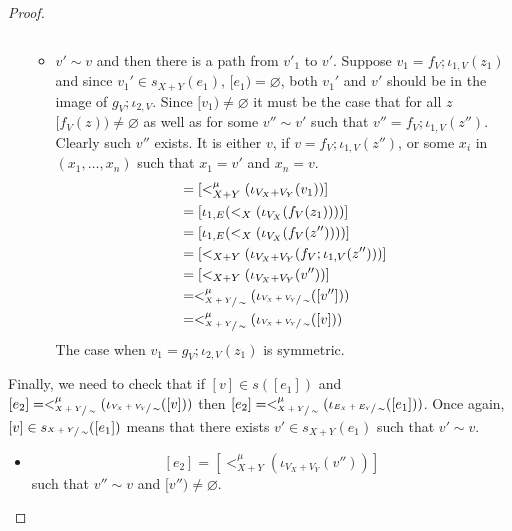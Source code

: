 \begin{proof}
\begin{itemize}
\begin{itemize}
\[                \]
                \item $v' \sim v$ and then there is a path from $v'_1$ to $v'$. 
                Suppose $v_1 = f_{V};\iota_{1,V}(z_1)$ and since $v_1' \in s_{X+Y}(e_1)$, $[e_1) = \varnothing$, both $v_1'$ and $v'$ should be in the image of $g_{V};\iota_{2,V}$.
                Since $[v_1) \not = \varnothing$ it must be the case that for all $z$ $[f_{V}(z)) \not = \varnothing$ as well as for some $v'' \sim v'$ such that $v'' = f_{V};\iota_{1,V}(z'')$.
                Clearly such $v''$ exists.
                It is either $v$, if $v = f_{V};\iota_{1,V}(z'')$, or some $x_i$ in $(x_1, \ldots, x_n)$ such that $x_1 = v'$ and $x_n = v$.
                \begin{align*}
                    [e_2] &= [<_{X+Y}^{\mu}(\iota_{V_{X} + V_{Y}}(v_1))]\\
                          &= [\iota_{1,E}(<_{X}(\iota_{V_{X}}(f_{V}(z_1))))]\\
                          &= [\iota_{1,E}(<_{X}(\iota_{V_{X}}(f_{V}(z''))))]\\
                          &= [<_{X+Y}(\iota_{V_{X} + V_{Y}}(f_{V};\iota_{1,V}(z'')))]\\
                          &= [<_{X+Y}(\iota_{V_{X} + V_{Y}}(v''))]\\
                          &= <_{\sfrac{X+Y}{\sim}}^{\mu}(\iota_{\sfrac{V_{X} + V_{Y}}{\sim}}([v'']))\\
                          &= <_{\sfrac{X+Y}{\sim}}^{\mu}(\iota_{\sfrac{V_{X} + V_{Y}}{\sim}}([v]))
                \end{align*}
                The case when $v_1 = g_{V};\iota_{2,V}(z_1)$ is symmetric.
            \end{itemize}
            \end{itemize}
            \item Finally, we need to check that if $[v] \in s([e_1])$ and $[e_2] = <_{\sfrac{X+Y}{\sim}}^{\mu}(\iota_{\sfrac{V_{X} + V_{Y}}{\sim}}([v]))$ then $[e_2] = <_{\sfrac{X+Y}{\sim}}^{\mu}(\iota_{\sfrac{E_{X} + E_{Y}}{\sim}}([e_1]))$.
            Once again, $[v] \in s_{\sfrac{X+Y}{\sim}}([e_1])$ means that there exists $v' \in s_{X+Y}(e_1)$ such that $v' \sim v$.
            \begin{itemize}
                \item \[
                [e_2] = [<_{X+Y}^{\mu}(\iota_{V_{X} + V_{Y}}(v''))]
                \] such that $v'' \sim v$ and $[v'') \not = \varnothing$.
                \begin{itemize}

\end{itemize}
\end{itemize}
\end{proof}
